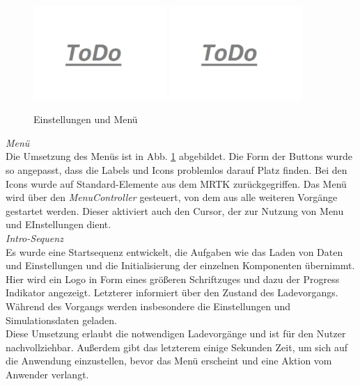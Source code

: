 \begin{figure}[H]
	\centering
	\includegraphics[width=0.45\textwidth]{images/todo.jpg}
	\hspace{0.05cm}	
	\includegraphics[width=0.45\textwidth]{images/todo.jpg}
	\caption{Einstellungen und Menü}
	\label{img:menu-and-settings}
\end{figure}

\textit{Menü}\\
Die Umsetzung des Menüs ist in Abb. \ref{img:menu-and-settings} abgebildet. Die Form der Buttons wurde so angepasst, dass die Labels und Icons problemlos darauf Platz finden. Bei den Icons wurde auf Standard-Elemente aus dem MRTK zurückgegriffen. Das Menü wird über den \textit{MenuController} gesteuert, von dem aus alle weiteren Vorgänge gestartet werden. Dieser aktiviert auch den Cursor, der zur Nutzung von Menu und EInstellungen dient.\\

\textit{Intro-Sequenz}\\
Es wurde eine Startsequenz entwickelt, die Aufgaben wie das Laden von Daten und Einstellungen und die Initialisierung der einzelnen Komponenten übernimmt. Hier wird ein Logo in Form eines größeren Schriftzuges und dazu der Progress Indikator angezeigt. Letzterer informiert über den Zustand des Ladevorgangs. Während des Vorgangs werden insbesondere die Einstellungen und  Simulationsdaten geladen.\\

Diese Umsetzung erlaubt die notwendigen Ladevorgänge und ist für den Nutzer nachvollziehbar. Außerdem gibt das letzterem einige Sekunden Zeit, um sich auf die Anwendung einzustellen, bevor das Menü erscheint und eine Aktion vom Anwender verlangt.



